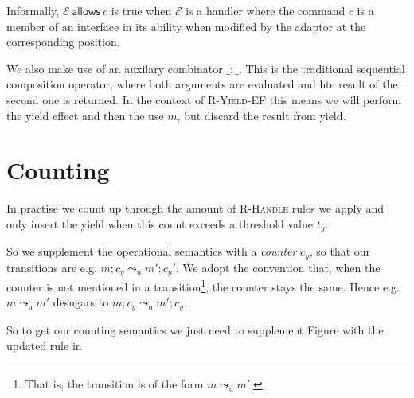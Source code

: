 \documentclass[msc,deptreport,cs]{infthesis} %
\makeatletter
\newcommand\allows{\textsf{allows}\xspace}
\newcommand{\todo}[1]
           {{\par\noindent\small\color{RoyalPurple}
  \framebox{\parbox{\dimexpr\linewidth-2\fboxsep-2\fboxrule}
    {\textbf{TODO:} #1}}}}
\newcommand{\many}{\overline}
\newcommand\ba{\begin{array}}
\newcommand\ea{\end{array}}
\newenvironment{equations}{\[\ba{@{}r@{~}c@{~}l@{}}}{\ea\]\ignorespacesafterend}
\newcommand{\ext}{\Xi}
\newcommand{\sig}{I}
\newcommand{\snoc}{\ }
\newcommand{\id}{\iota}
\newcommand{\EC}{\mathcal{E}}
\newcommand{\EF}{\mathcal{F}}
\newcommand{\redtou}{\leadsto_{\mathrm{u}}}
\newcommand{\meta}{\mathsf}
\newcommand{\af}{\meta{af}}
\makeatother
\begin{document}
Informally, $\EC~\allows~c$ is true when $\EC$ is a handler where the command
$c$ is a member of an interface in its ability when modified by the adaptor at
the corresponding position.

\todo{Clean this up}


We also make use of an auxilary combinator $\_ ; \_$. This is the traditional
sequential composition operator, where both arguments are evaluated and hte
result of the second one is returned. In the context of \textsc{R-Yield-EF} this
means we will perform the \textsf{yield} effect and then the use $m$, but
discard the result from \textsf{yield}.




\section{Counting}

In practise we count up through the amount of \textsc{R-Handle} rules we apply
and only insert the yield when this count exceeds a threshold value $t_y$.

So we supplement the operational semantics with a \emph{counter} $c_y$, so
that our transitions are e.g. $m; c_y \redtou m'; {c_y}'$. We adopt the
convention that, when the counter is not mentioned in a transition\footnote{That
is, the transition is of the form $m \redtou m'$.}, the counter stays the same.
Hence e.g. $m \redtou m'$ desugars to $m; c_y \redtou m'; {c_y}$.

So to get our counting semantics we just need to supplement Figure
\cite{fig:operational-semantics} with the updated rule in
\end{document}
